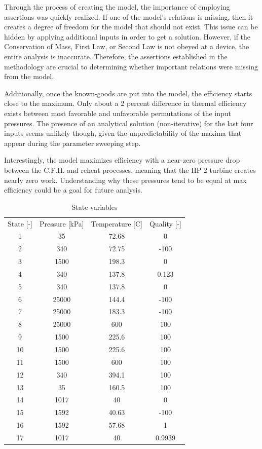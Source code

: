 \documentclass[10pt,cleanfoot]{asme2ej}
\begin{document}
Through the process of creating the model, the importance of employing assertions was quickly realized. If one of the model's relations is missing, then it creates a degree of freedom for the model that should not exist. This issue can be hidden by applying additional inputs in order to get a solution. However, if the Conservation of Mass, First Law, or Second Law is not obeyed at a device, the entire analysis is inaccurate. Therefore, the assertions established in the methodology are crucial to determining whether important relations were missing from the model.

Additionally, once the known-goods are put into the model, the efficiency starts close to the maximum. Only about a 2 percent difference in thermal efficiency exists between most favorable and unfavorable permutations of the input pressures. The presence of an analytical solution (non-iterative) for the last four inputs seems unlikely though, given the unpredictability of the maxima that appear during the parameter sweeping step.

Interestingly, the model maximizes efficiency with a near-zero pressure drop between the C.F.H. and reheat processes, meaning that the HP 2 turbine creates nearly zero work. Understanding why these pressures tend to be equal at max efficiency could be a goal for future analysis.

\begin{table}[t]
\caption{State variables}
\begin{center}
\label{table_ASME}
\begin{tabular}{c c c c }
& & & \\ %
\hline
State [-] & Pressure [kPa] & Temperature [C] & Quality [-] \\
\hline
1 & 35 & 72.68 & 0 \\
2 & 340 & 72.75 & -100 \\
3 & 1500 & 198.3 & 0 \\
4 & 340 & 137.8 & 0.123 \\
5 & 340 & 137.8 & 0 \\
6 & 25000 & 144.4 & -100 \\
7 & 25000 & 183.3 & -100 \\
8 & 25000 & 600 & 100 \\
9 & 1500 & 225.6 & 100 \\
10 & 1500 & 225.6 & 100 \\
11 & 1500 & 600 & 100 \\
12 & 340 & 394.1 & 100 \\
13 & 35 & 160.5 & 100 \\
\hline
14 & 1017 & 40 & 0 \\
15 & 1592 & 40.63 & -100 \\
16 & 1592 & 57.68 & 1 \\
17 & 1017 & 40 & 0.9939 \\
\hline
\end{tabular}
\end{center}
\end{table}
\end{document}
